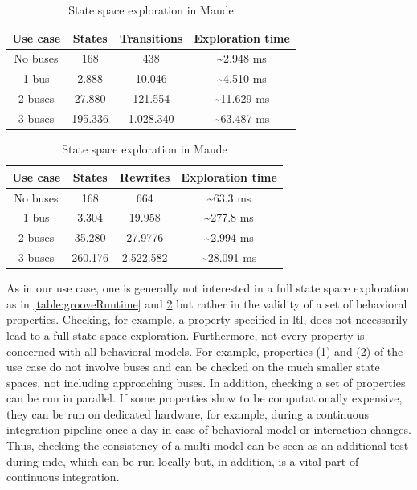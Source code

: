 \documentclass{jot}
\begin{document}
\begin{table}
\centering

\begin{tabular}{|c || c | c | c |}
 \hline
 Use case & States & Transitions & Exploration time \\
 \hline\hline
 No buses & 168 & 438 & \textasciitilde 2.948 ms \\
 \hline
 1 bus & 2.888 & 10.046 & \textasciitilde 4.510 ms \\
 \hline
 2 buses & 27.880 & 121.554 & \textasciitilde 11.629 ms \\
 \hline
 3 buses & 195.336 & 1.028.340 & \textasciitilde 63.487 ms \\
 \hline
\end{tabular}
\caption[State space exploration in Groove]{State space exploration in Groove\cref{footnote:benchmark}}
\label{table:grooveRuntime}

\bigskip

\begin{tabular}{|c || c | c | c |}
 \hline
 Use case & States & Rewrites & Exploration time \\
 \hline\hline
 No buses & 168 & 664 & \textasciitilde 63.3 ms \\
 \hline
 1 bus & 3.304 & 19.958 & \textasciitilde 277.8 ms \\
 \hline
 2 buses & 35.280 & 27.9776 & \textasciitilde 2.994 ms \\
 \hline
 3 buses & 260.176 & 2.522.582 & \textasciitilde 28.091 ms \\
 \hline
\end{tabular}
\caption[State space exploration in Maude]{State space exploration in Maude\footnotemark}
\label{table:maudeRuntime}

\end{table}


As in our use case, one is generally not interested in a full state space exploration as in \cref{table:grooveRuntime} and \cref{table:maudeRuntime} but rather in the validity of a set of behavioral properties.
Checking, for example, a property specified in \gls*{ltl}, does not necessarily lead to a full state space exploration.
Furthermore, not every property is concerned with all behavioral models.
For example, properties (1) and (2) of the use case do not involve buses and can be checked on the much smaller state spaces, not including approaching buses.
In addition, checking a set of properties can be run in parallel.
If some properties show to be computationally expensive, they can be run on dedicated hardware, for example, during a continuous integration pipeline once a day in case of behavioral model or interaction changes.
Thus, checking the consistency of a multi-model can be seen as an additional test during \gls*{mde}, which can be run locally but, in addition, is a vital part of continuous integration.
\end{document}
